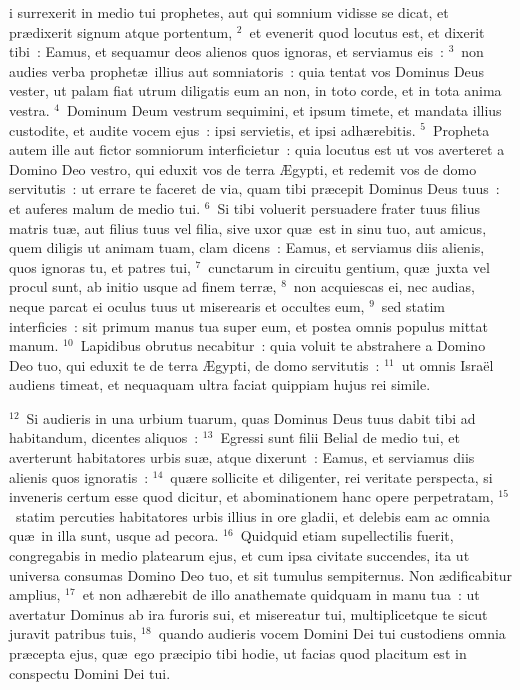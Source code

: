 \bchapter
{}i surrexerit in medio tui prophetes, aut qui somnium vidisse se dicat, et pr\ae dixerit signum atque portentum,
${}^{2}$~et evenerit quod locutus est, et dixerit tibi~: Eamus, et sequamur deos alienos quos ignoras, et serviamus eis~:
${}^{3}$~non audies verba prophet\ae\ illius aut somniatoris~: quia tentat vos Dominus Deus vester, ut palam fiat utrum diligatis eum an non, in toto corde, et in tota anima vestra.
${}^{4}$~Dominum Deum vestrum sequimini, et ipsum timete, et mandata illius custodite, et audite vocem ejus~: ipsi servietis, et ipsi adh\ae rebitis.
${}^{5}$~Propheta autem ille aut fictor somniorum interficietur~: quia locutus est ut vos averteret a Domino Deo vestro, qui eduxit vos de terra \AE gypti, et redemit vos de domo servitutis~: ut errare te faceret de via, quam tibi pr\ae cepit Dominus Deus tuus~: et auferes malum de medio tui.
${}^{6}$~Si tibi voluerit persuadere frater tuus filius matris tu\ae , aut filius tuus vel filia, sive uxor qu\ae\ est in sinu tuo, aut amicus, quem diligis ut animam tuam, clam dicens~: Eamus, et serviamus diis alienis, quos ignoras tu, et patres tui,
${}^{7}$~cunctarum in circuitu gentium, qu\ae\ juxta vel procul sunt, ab initio usque ad finem terr\ae ,
${}^{8}$~non acquiescas ei, nec audias, neque parcat ei oculus tuus ut miserearis et occultes eum,
${}^{9}$~sed statim interficies~: sit primum manus tua super eum, et postea omnis populus mittat manum.
${}^{10}$~Lapidibus obrutus necabitur~: quia voluit te abstrahere a Domino Deo tuo, qui eduxit te de terra \AE gypti, de domo servitutis~:
${}^{11}$~ut omnis Isra\"el audiens timeat, et nequaquam ultra faciat quippiam hujus rei simile.


${}^{12}$~Si audieris in una urbium tuarum, quas Dominus Deus tuus dabit tibi ad habitandum, dicentes aliquos~:
${}^{13}$~Egressi sunt filii Belial de medio tui, et averterunt habitatores urbis su\ae , atque dixerunt~: Eamus, et serviamus diis alienis quos ignoratis~:
${}^{14}$~qu\ae re sollicite et diligenter, rei veritate perspecta, si inveneris certum esse quod dicitur, et abominationem hanc opere perpetratam,
${}^{15}$~statim percuties habitatores urbis illius in ore gladii, et delebis eam ac omnia qu\ae\ in illa sunt, usque ad pecora.
${}^{16}$~Quidquid etiam supellectilis fuerit, congregabis in medio platearum ejus, et cum ipsa civitate succendes, ita ut universa consumas Domino Deo tuo, et sit tumulus sempiternus. Non \ae dificabitur amplius,
${}^{17}$~et non adh\ae rebit de illo anathemate quidquam in manu tua~: ut avertatur Dominus ab ira furoris sui, et misereatur tui, multiplicetque te sicut juravit patribus tuis,
${}^{18}$~quando audieris vocem Domini Dei tui custodiens omnia pr\ae cepta ejus, qu\ae\ ego pr\ae cipio tibi hodie, ut facias quod placitum est in conspectu Domini Dei tui.

